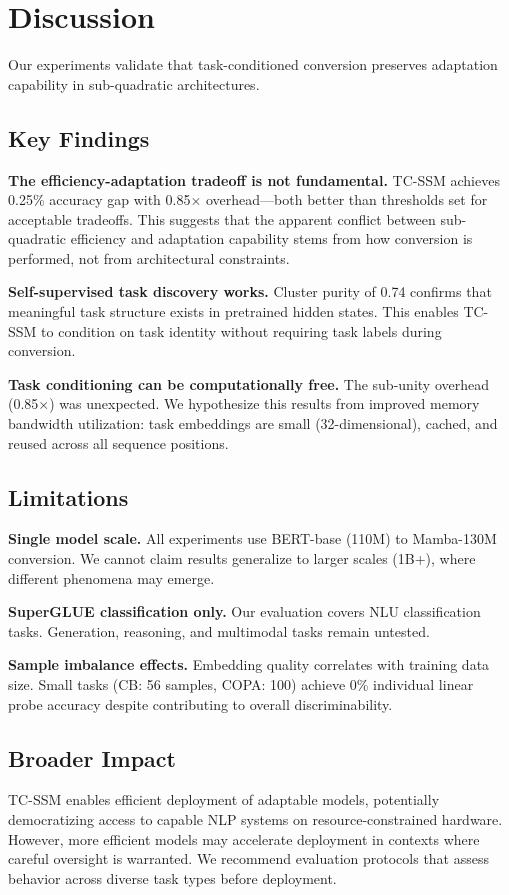 \section{Discussion}

Our experiments validate that task-conditioned conversion preserves adaptation capability in sub-quadratic architectures.

\subsection{Key Findings}

\textbf{The efficiency-adaptation tradeoff is not fundamental.} TC-SSM achieves 0.25\% accuracy gap with 0.85$\times$ overhead---both better than thresholds set for acceptable tradeoffs. This suggests that the apparent conflict between sub-quadratic efficiency and adaptation capability stems from how conversion is performed, not from architectural constraints.

\textbf{Self-supervised task discovery works.} Cluster purity of 0.74 confirms that meaningful task structure exists in pretrained hidden states. This enables TC-SSM to condition on task identity without requiring task labels during conversion.

\textbf{Task conditioning can be computationally free.} The sub-unity overhead (0.85$\times$) was unexpected. We hypothesize this results from improved memory bandwidth utilization: task embeddings are small (32-dimensional), cached, and reused across all sequence positions.

\subsection{Limitations}

\textbf{Single model scale.} All experiments use BERT-base (110M) to Mamba-130M conversion. We cannot claim results generalize to larger scales (1B+), where different phenomena may emerge.

\textbf{SuperGLUE classification only.} Our evaluation covers NLU classification tasks. Generation, reasoning, and multimodal tasks remain untested.

\textbf{Sample imbalance effects.} Embedding quality correlates with training data size. Small tasks (CB: 56 samples, COPA: 100) achieve 0\% individual linear probe accuracy despite contributing to overall discriminability.

\subsection{Broader Impact}

TC-SSM enables efficient deployment of adaptable models, potentially democratizing access to capable NLP systems on resource-constrained hardware. However, more efficient models may accelerate deployment in contexts where careful oversight is warranted. We recommend evaluation protocols that assess behavior across diverse task types before deployment.
